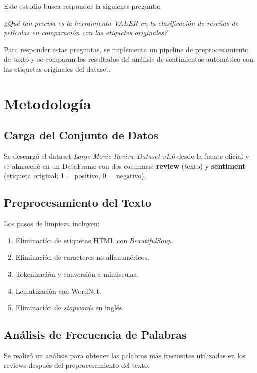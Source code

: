 \documentclass[conference]{IEEEtran}
\begin{document}
Este estudio busca responder la siguiente pregunta:

\textit{¿Qué tan precisa es la herramienta VADER en la clasificación de reseñas de películas en comparación con las etiquetas originales?}

Para responder estas preguntas, se implementa un pipeline de preprocesamiento de texto y se comparan los resultados del análisis de sentimientos automático con las etiquetas originales del dataset.



\section{Metodología}

\subsection{Carga del Conjunto de Datos}

Se descargó el dataset \textit{Large Movie Review Dataset v1.0} desde la fuente oficial y se almacenó en un DataFrame con dos columnas: \textbf{review} (texto) y \textbf{sentiment} (etiqueta original: 1 = positivo, 0 = negativo).


\subsection{Preprocesamiento del Texto}

Los pasos de limpieza incluyen:
\begin{enumerate}
    \item Eliminación de etiquetas HTML con \textit{BeautifulSoup}.
    \item Eliminación de caracteres no alfanuméricos.
    \item Tokenización y conversión a minúsculas.
    \item Lematización con WordNet.
    \item Eliminación de \textit{stopwords} en inglés.
\end{enumerate}


\subsection{Análisis de Frecuencia de Palabras}

Se realizó un análisis para obtener las palabras más frecuentes utilizadas en los reviews  después del preprocesamiento del texto.
\end{document}
